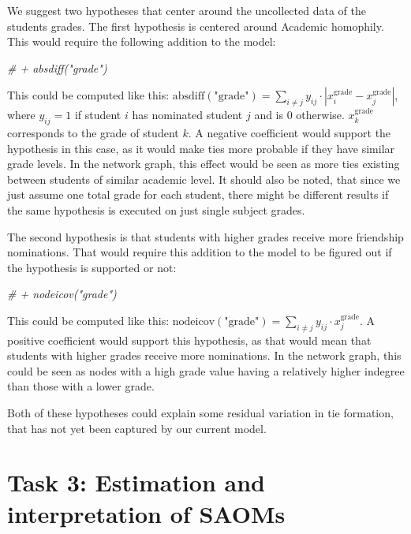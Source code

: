 \documentclass[
]{article}
\newenvironment{Shaded}{\begin{snugshade}}{\end{snugshade}}
\newcommand{\CommentTok}[1]{\textcolor[rgb]{0.56,0.35,0.01}{\textit{#1}}}
\begin{document}
We suggest two hypotheses that center around the uncollected data of the
students grades. The first hypothesis is centered around Academic
homophily. This would require the following addition to the model:

\begin{Shaded}
\begin{Highlighting}[]
\CommentTok{\# + absdiff("grade")}
\end{Highlighting}
\end{Shaded}

This could be computed like this:
\(\text{absdiff}(\text{"grade"}) = \sum_{i \neq j} y_{ij} \cdot |x_i^{\text{grade}} - x_j^{\text{grade}}|\),
where \(y_{ij}=1\) if student \(i\) has nominated student \(j\) and is
\(0\) otherwise. \(x_k^{\text{grade}}\) corresponds to the grade of
student \(k\). A negative coefficient would support the hypothesis in
this case, as it would make ties more probable if they have similar
grade levels. In the network graph, this effect would be seen as more
ties existing between students of similar academic level. It should also
be noted, that since we just assume one total grade for each student,
there might be different results if the same hypothesis is executed on
just single subject grades.

The second hypothesis is that students with higher grades receive more
friendship nominations. That would require this addition to the model to
be figured out if the hypothesis is supported or not:

\begin{Shaded}
\begin{Highlighting}[]
\CommentTok{\# + nodeicov("grade")}
\end{Highlighting}
\end{Shaded}

This could be computed like this:
\(\text{nodeicov}(\text{"grade"}) = \sum_{i \neq j} y_{ij} \cdot x_j^{\text{grade}}\).
A positive coefficient would support this hypothesis, as that would mean
that students with higher grades receive more nominations. In the
network graph, this could be seen as nodes with a high grade value
having a relatively higher indegree than those with a lower grade.

Both of these hypotheses could explain some residual variation in tie
formation, that has not yet been captured by our current model.

\section{Task 3: Estimation and interpretation of
SAOMs}\label{task-3-estimation-and-interpretation-of-saoms}
\end{document}
